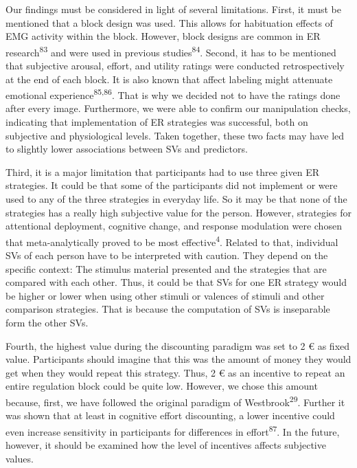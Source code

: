 \documentclass[
  man,floatsintext]{apa6}
\begin{document}
Our findings must be considered in light of several limitations.
First, it must be mentioned that a block design was used.
This allows for habituation effects of EMG activity within the block.
However, block designs are common in ER research\textsuperscript{83} and were used in previous studies\textsuperscript{84}.
Second, it has to be mentioned that subjective arousal, effort, and utility ratings were conducted retrospectively at the end of each block.
It is also known that affect labeling might attenuate emotional experience\textsuperscript{85,86}.
That is why we decided not to have the ratings done after every image.
Furthermore, we were able to confirm our manipulation checks, indicating that implementation of ER strategies was successful, both on subjective and physiological levels.
Taken together, these two facts may have led to slightly lower associations between SVs and predictors.

Third, it is a major limitation that participants had to use three given ER strategies.
It could be that some of the participants did not implement or were used to any of the three strategies in everyday life.
So it may be that none of the strategies has a really high subjective value for the person.
However, strategies for attentional deployment, cognitive change, and response modulation were chosen that meta-analytically proved to be most effective\textsuperscript{4}.
Related to that, individual SVs of each person have to be interpreted with caution.
They depend on the specific context: The stimulus material presented and the strategies that are compared with each other.
Thus, it could be that SVs for one ER strategy would be higher or lower when using other stimuli or valences of stimuli and other comparison strategies.
That is because the computation of SVs is inseparable form the other SVs.

Fourth, the highest value during the discounting paradigm was set to 2 € as fixed value.
Participants should imagine that this was the amount of money they would get when they would repeat this strategy.
Thus, 2 € as an incentive to repeat an entire regulation block could be quite low.
However, we chose this amount because, first, we have followed the original paradigm of Westbrook\textsuperscript{29}.
Further it was shown that at least in cognitive effort discounting, a lower incentive could even increase sensitivity in participants for differences in effort\textsuperscript{87}.
In the future, however, it should be examined how the level of incentives affects subjective values.
\end{document}
